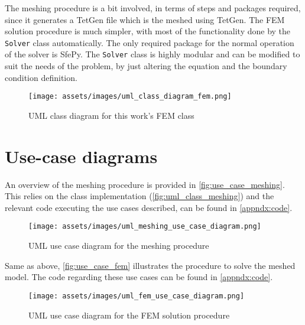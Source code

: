 The meshing procedure is a bit involved, in terms of steps and packages required, since it generates a TetGen file which is the meshed using TetGen. The \gls{FEM} solution procedure is much simpler, with most of the functionality done by the \texttt{Solver} class automatically. The only required package for the normal operation of the solver is SfePy. The \texttt{Solver} class is highly modular and can be modified to suit the needs of the problem, by just altering the equation and the boundary condition definition.

\begin{figure}[H]
    \centering
    \texttt{[image: assets/images/uml\_class\_diagram\_fem.png]}
    \caption{\gls{UML} class diagram for this work's \gls{FEM} class}
    \label{fig:uml_class_fem}
\end{figure}

\section{Use-case diagrams}

An overview of the meshing procedure is provided in \autoref{fig:use_case_meshing}. This relies on the class implementation (\autoref{fig:uml_class_meshing}) and the relevant code executing the use cases described, can be found in \autoref{appndx:code}.

\begin{figure}[H]
    \centering
    \texttt{[image: assets/images/uml\_meshing\_use\_case\_diagram.png]}
    \caption{\gls{UML} use case diagram for the meshing procedure}
    \label{fig:use_case_meshing}
\end{figure}

Same as above, \autoref{fig:use_case_fem} illustrates the procedure to solve the meshed model. The code regarding these use cases can be found in \autoref{appndx:code}.

\begin{figure}[H]
    \centering
    \texttt{[image: assets/images/uml\_fem\_use\_case\_diagram.png]}
    \caption{\gls{UML} use case diagram for the \gls{FEM} solution procedure}
    \label{fig:use_case_fem}
\end{figure}
